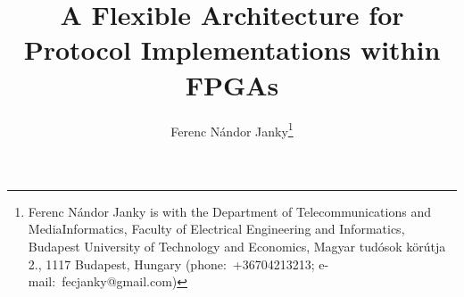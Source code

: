 \documentclass[journal]{IEEEtran}
\begin{document}
\title{A Flexible Architecture for Protocol Implementations within FPGAs}

\author{Ferenc Nándor Janky\thanks{Ferenc Nándor Janky	is with the Department of \mbox{Telecommunications} and
        \mbox{MediaInformatics},
        Faculty of Electrical Engineering and Informatics, Budapest University of Technology and \mbox{Economics},
        Magyar tudósok
        körútja 2., 1117 Budapest, Hungary (\mbox{phone: +36704213213}; \mbox{e-mail:
            fecjanky@gmail.com})}%
}%

%
{}


\maketitle
\end{document}
